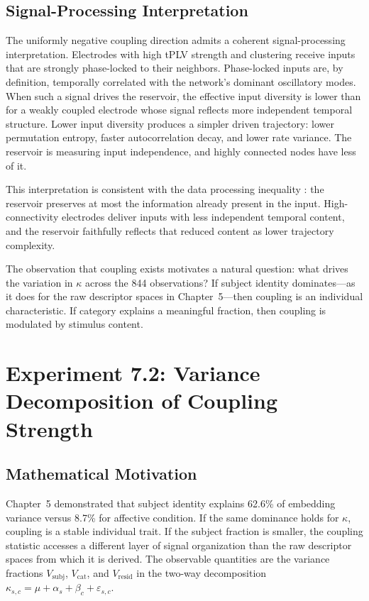 \subsection{Signal-Processing Interpretation}

The uniformly negative coupling direction admits a coherent signal-processing interpretation. Electrodes with high tPLV strength and clustering receive inputs that are strongly phase-locked to their neighbors. Phase-locked inputs are, by definition, temporally correlated with the network's dominant oscillatory modes. When such a signal drives the reservoir, the effective input diversity is lower than for a weakly coupled electrode whose signal reflects more independent temporal structure. Lower input diversity produces a simpler driven trajectory: lower permutation entropy, faster autocorrelation decay, and lower rate variance. The reservoir is measuring input independence, and highly connected nodes have less of it.

This interpretation is consistent with the data processing inequality \cite{cover_elements_2006}: the reservoir preserves at most the information already present in the input. High-connectivity electrodes deliver inputs with less independent temporal content, and the reservoir faithfully reflects that reduced content as lower trajectory complexity.

The observation that coupling exists motivates a natural question: what drives the variation in $\kappa$ across the 844 observations? If subject identity dominates---as it does for the raw descriptor spaces in Chapter~5---then coupling is an individual characteristic. If category explains a meaningful fraction, then coupling is modulated by stimulus content.


\section{Experiment 7.2: Variance Decomposition of Coupling Strength}
\label{sec:exp7_variance}

\subsection{Mathematical Motivation}

Chapter~5 demonstrated that subject identity explains 62.6\% of embedding variance versus 8.7\% for affective condition. If the same dominance holds for $\kappa$, coupling is a stable individual trait. If the subject fraction is smaller, the coupling statistic accesses a different layer of signal organization than the raw descriptor spaces from which it is derived. The observable quantities are the variance fractions $V_{\text{subj}}$, $V_{\text{cat}}$, and $V_{\text{resid}}$ in the two-way decomposition $\kappa_{s,c} = \mu + \alpha_s + \beta_c + \varepsilon_{s,c}$.

